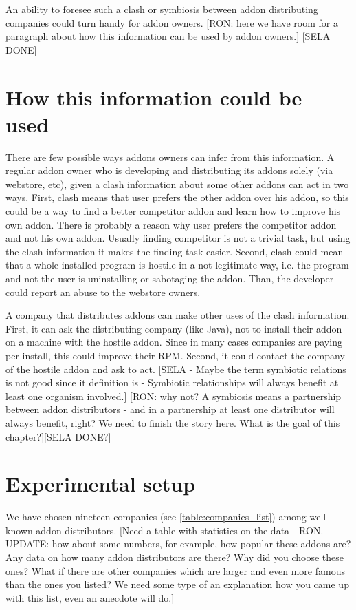 \documentclass[11pt,oneside]{book}
\let\Oldsection\section
\renewcommand{\section}{\FloatBarrier\Oldsection}
\begin{document}
An ability to foresee such a clash or symbiosis between addon distributing companies could turn handy for addon owners. [RON: here we have room for a paragraph about how this information can be used by addon owners.] [SELA DONE]
\section{How this information could be used}
There are few possible ways addons owners can infer from this information.
A regular addon owner who is developing and distributing its addons solely (via webstore, etc), given a clash information about some other addons can act in two ways.
First, clash means that user prefers the other addon over his addon, so this could be a way to find a better competitor addon and learn how to improve his own addon. There is probably a reason why user prefers the competitor addon and not his own addon. Usually finding competitor is not a trivial task, but using the clash information it makes the finding task easier.
Second, clash could mean that a whole installed program is hostile in a not legitimate way, i.e. the program and not the user is uninstalling or sabotaging the addon. Than, the developer could report an abuse to the webstore owners.

A company that distributes addons can make other uses of the clash information.
First, it can ask the distributing company (like Java), not to install their addon on a machine with the hostile addon. Since in many cases companies are paying per install, this could improve their RPM.
Second, it could contact the company of the hostile addon and ask to act.
[SELA - Maybe the term symbiotic relations is not good since it definition is  - Symbiotic relationships will always benefit at least one organism involved.] [RON: why not? A symbiosis means a partnership between addon distributors - and in a partnership at least one distributor will always benefit, right? We need to finish the story here. What is the goal of this chapter?][SELA DONE?]

\section{Experimental setup}
We have chosen nineteen companies (see \autoref{table:companies_list}) among well-known addon distributors. [Need a table with statistics on the data - RON. UPDATE: how about some numbers, for example, how popular these addons are? Any data on how many addon distributors are there? Why did you choose these ones? What if there are other companies which are larger and even more famous than the ones you listed? We need some type of an explanation how you came up with this list, even an anecdote will do.]
\end{document}
